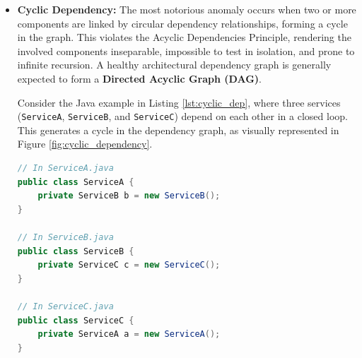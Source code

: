 \begin{itemize}
  \item \textbf{Cyclic Dependency:} The most notorious anomaly occurs
    when two or more components are linked by circular dependency
    relationships, forming a cycle in the graph. This violates the
    Acyclic Dependencies Principle, rendering the involved components
    inseparable, impossible to test in isolation, and prone to
    infinite recursion. A healthy architectural dependency graph is
    generally expected to form a \textbf{Directed Acyclic Graph (DAG)}.

    Consider the Java example in Listing \ref{lst:cyclic_dep}, where
    three services (\texttt{ServiceA}, \texttt{ServiceB}, and \texttt{ServiceC})
    depend on each other in a closed loop. This generates a cycle in
    the dependency graph, as visually represented in Figure
    \ref{fig:cyclic_dependency}.

\begin{lstlisting}[language=Java,caption={Example of a Cyclic Dependency involving three Java services.},label={lst:cyclic_dep}]
// In ServiceA.java
public class ServiceA {
    private ServiceB b = new ServiceB();
}

// In ServiceB.java
public class ServiceB {
    private ServiceC c = new ServiceC();
}

// In ServiceC.java
public class ServiceC {
    private ServiceA a = new ServiceA();
}
\end{lstlisting}


\end{itemize}
